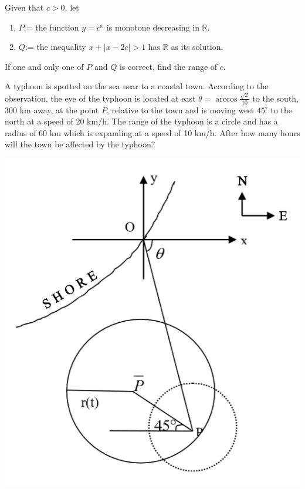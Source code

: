 \documentclass[letterpaper,10pt,addpoints]{exam}
\begin{document}
\begin{questions}
\question[12]
Given that $c>0$, let
\renewcommand{\labelenumi}{}
\begin{enumerate}
     \item $P$:= the function $y=c^x$ is monotone decreasing in $\mathbb{R}$.
     \item $Q$:= the inequality $x+|x-2c|>1$ has $\mathbb{R}$ as its solution.
\end{enumerate}
If one and only one of $P$ and $Q$ is correct, find the range of $c$.
\clearpage

\question[12]
A typhoon is spotted on the sea near to a coastal town. According to the observation, the eye of the typhoon is located at east $\theta=\arccos\frac{\sqrt{2}}{10}$ to the south, 300 km away, at the point $P$, relative to the town and is moving west $45^{\circ}$ to the north at a speed of 20 km/h. The range of the typhoon is a circle and has a radius of 60 km which is expanding at a speed of 10 km/h. After how many hours will the town be affected by the typhoon?
\begin{center}
    \includegraphics[scale=0.6]{q20.PNG}
\end{center}


\end{questions}
\end{document}
